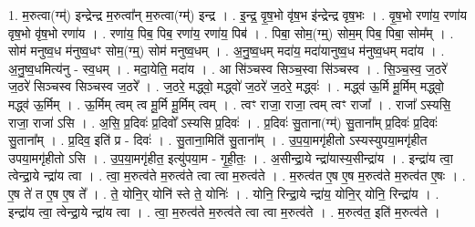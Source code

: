 \documentclass[17pt]{extarticle}
\begin{document}
1. म॒रुत्वा(ग्म्॑) इन्द्रेन्द्र म॒रुत्वा᳚न् म॒रुत्वा(ग्म्॑) इन्द्र । . इ॒न्द्र॒ वृ॒ष॒भो वृ॑ष॒भ इ॑न्द्रेन्द्र वृष॒भः । . वृ॒ष॒भो रणा॑य॒ रणा॑य वृष॒भो वृ॑ष॒भो रणा॑य । . रणा॑य॒ पिब॒ पिब॒ रणा॑य॒ रणा॑य॒ पिब॑ । . पिबा॒ सोम॒(ग्म्॒) सोम॒म् पिब॒ पिबा॒ सोम᳚म् । . सोम॑ मनुष्व॒ध म॑नुष्व॒धꣳ सोम॒(ग्म्॒) सोम॑ मनुष्व॒धम् । . अ॒नु॒ष्व॒धम् मदा॑य॒ मदा॑यानुष्व॒ध म॑नुष्व॒धम् मदा॑य । . अ॒नु॒ष्व॒धमित्य॑नु - स्व॒धम् । . मदा॒येति॒ मदा॑य । . आ सि॑ञ्चस्व सिञ्च॒स्वा सि॑ञ्चस्व । . सि॒ञ्च॒स्व॒ ज॒ठरे॑ ज॒ठरे॑ सिञ्चस्व सिञ्चस्व ज॒ठरे᳚ । . ज॒ठरे॒ मद्ध्वो॒ मद्ध्वो॑ ज॒ठरे॑ ज॒ठरे॒ मद्ध्वः॑ । . मद्ध्व॑ ऊ॒र्मि मू॒र्मिम् मद्ध्वो॒ मद्ध्व॑ ऊ॒र्मिम् । . ऊ॒र्मिम् त्वम् त्व मू॒र्मि मू॒र्मिम् त्वम् । . त्वꣳ राजा॒ राजा॒ त्वम् त्वꣳ राजा᳚ । . राजा᳚ ऽस्यसि॒ राजा॒ राजा॑ ऽसि । . अ॒सि॒ प्र॒दिवः॑ प्र॒दिवो᳚ ऽस्यसि प्र॒दिवः॑ । . प्र॒दिवः॑ सु॒ताना(ग्म्॑) सु॒ताना᳚म् प्र॒दिवः॑ प्र॒दिवः॑ सु॒ताना᳚म् । . प्र॒दिव॒ इति॑ प्र - दिवः॑ । . सु॒ताना॒मिति॑ सु॒ताना᳚म् । . उ॒प॒या॒मगृ॑हीतो ऽस्यस्युपया॒मगृ॑हीत उपया॒मगृ॑हीतो ऽसि । . उ॒प॒या॒मगृ॑हीत॒ इत्यु॑पया॒म - गृ॒ही॒तः॒ । . अ॒सीन्द्रा॒ये न्द्रा॑यास्य॒सीन्द्रा॑य । . इन्द्रा॑य त्वा॒ त्वेन्द्रा॒ये न्द्रा॑य त्वा । . त्वा॒ म॒रुत्व॑ते म॒रुत्व॑ते त्वा त्वा म॒रुत्व॑ते । . म॒रुत्व॑त ए॒ष ए॒ष म॒रुत्व॑ते म॒रुत्व॑त ए॒षः । . ए॒ष ते॑ त ए॒ष ए॒ष ते᳚ । . ते॒ योनि॒र् योनि॑ स्ते ते॒ योनिः॑ । . योनि॒ रिन्द्रा॒ये न्द्रा॑य॒ योनि॒र् योनि॒ रिन्द्रा॑य । . इन्द्रा॑य त्वा॒ त्वेन्द्रा॒ये न्द्रा॑य त्वा । . त्वा॒ म॒रुत्व॑ते म॒रुत्व॑ते त्वा त्वा म॒रुत्व॑ते । . म॒रुत्व॑त॒ इति॑ म॒रुत्व॑ते । \newline
\end{document}
